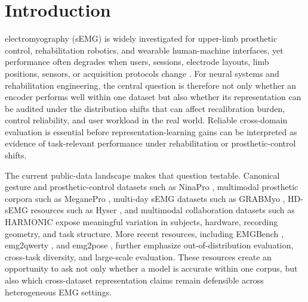\documentclass[journal]{IEEEtran}
\begin{document}
\section{Introduction}
 electromyography (sEMG) is widely investigated for upper-limb prosthetic control, rehabilitation robotics, and wearable human-machine interfaces, yet performance often degrades when users, sessions, electrode layouts, limb positions, sensors, or acquisition protocols change \cite{scheme2011state,felici2020limits,yang2024emgbench}. For neural systems and rehabilitation engineering, the central question is therefore not only whether an encoder performs well within one dataset but also whether its representation can be audited under the distribution shifts that can affect recalibration burden, control reliability, and user workload in the real world. Reliable cross-domain evaluation is essential before representation-learning gains can be interpreted as evidence of task-relevant performance under rehabilitation or prosthetic-control shifts.

The current public-data landscape makes that question testable. Canonical gesture and prosthetic-control datasets such as NinaPro \cite{atzori2014ninapro}, multimodal prosthetic corpora such as MeganePro \cite{giordaniello2017meganepro}, multi-day sEMG datasets such as GRABMyo \cite{pradhan2022grabmyo}, HD-sEMG resources such as Hyser \cite{jiang2021hyser}, and multimodal collaboration datasets such as HARMONIC \cite{newman2022harmonic} expose meaningful variation in subjects, hardware, recording geometry, and task structure. More recent resources, including EMGBench \cite{yang2024emgbench}, emg2qwerty \cite{sivakumar2024emg2qwerty}, and emg2pose \cite{salter2024emg2pose}, further emphasize out-of-distribution evaluation, cross-task diversity, and large-scale evaluation. These resources create an opportunity to ask not only whether a model is accurate within one corpus, but also which cross-dataset representation claims remain defensible across heterogeneous EMG settings.
\end{document}
